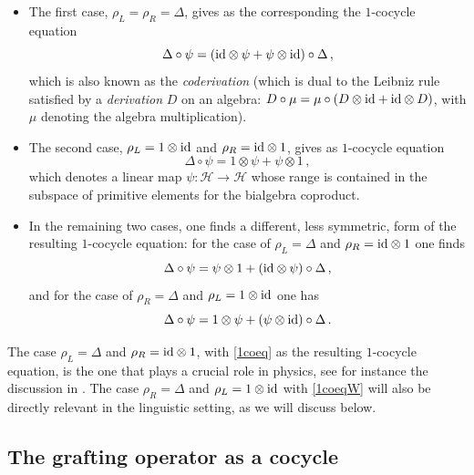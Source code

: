\documentclass[12pt]{amsart}
\numberwithin{equation}{section}
\def\cH{{\mathcal H}}
\begin{document}
\smallskip

\begin{itemize}
\item The first case, $\rho_L=\rho_R=\Delta$, gives as the corresponding the $1$-cocycle equation
$$ \Delta\circ \psi= ({\rm id}\otimes \psi + \psi \otimes {\rm id}) \circ \Delta\, , $$
which is also known as the {\em coderivation} (which is dual to the Leibniz rule
satisfied by a {\em derivation} $D$ on an algebra: $D \circ \mu =\mu \circ (D \otimes {\rm id} + {\rm id} \otimes D)$,
with $\mu$ denoting the algebra multiplication).  

\smallskip

\item The second case,  $\rho_L=1\otimes {\rm id}$ and $\rho_R = {\rm id}\otimes 1$, gives as $1$-cocycle equation
$$  \Delta\circ \psi = 1 \otimes \psi + \psi \otimes 1 \, , $$
which denotes a linear map $\psi: \cH \to \cH$ whose range is contained in the subspace of 
primitive elements for the bialgebra coproduct. 

\smallskip

\item In the remaining two cases, one finds a different, less symmetric, form of the resulting $1$-cocycle equation: 
for the case of $\rho_L=\Delta$ and $\rho_R = {\rm id}\otimes 1$ one finds
\begin{equation}\label{1coeq}
  \Delta\circ \psi = \psi \otimes 1 + ({\rm id}\otimes \psi) \circ \Delta\, , 
\end{equation}  
and for the case of $\rho_R=\Delta$ and $\rho_L=1\otimes {\rm id}$ one has 
\begin{equation}\label{1coeqW}
 \Delta\circ \psi = 1 \otimes \psi + (\psi \otimes {\rm id}) \circ \Delta \, . 
\end{equation} 
\end{itemize}

\smallskip

The case $\rho_L=\Delta$ and $\rho_R = {\rm id}\otimes 1$, with \eqref{1coeq} as the resulting
$1$-cocycle equation, is the one that plays a crucial role in physics, see for instance
the discussion in \cite{Panzer}. The case $\rho_R=\Delta$ and $\rho_L=1\otimes {\rm id}$ with \eqref{1coeqW} 
will also be directly relevant in the linguistic setting, as we will discuss below.

\smallskip
\subsection{The grafting operator as a cocycle}\label{graftBcocycleSec}
\end{document}
